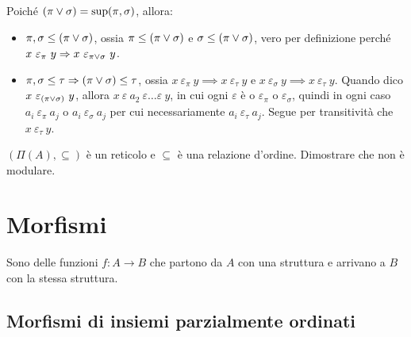 Poich\'e $(\pi \vee \sigma) = \sup (\pi, \sigma)$, allora:
\begin{itemize}
  \item $\pi, \sigma \le (\pi \vee \sigma)$, ossia $\pi \le (\pi \vee \sigma)$ e $\sigma \le (\pi \vee \sigma)$, vero per definizione perch\'e $x \ \varepsilon_{\pi} \ y \implies x \ \varepsilon_{\pi \supop \sigma} \ y$.
  \item $\pi, \sigma \le \tau \Rightarrow (\pi \vee \sigma) \le \tau$, ossia $x \ \varepsilon_{\pi} \ y \implies x \ \varepsilon_{\tau} \ y$ e $x \ \varepsilon_{\sigma} \ y \implies x \ \varepsilon_{\tau} \ y$. Quando dico $x \ \varepsilon_{(\pi \vee \sigma)} \ y$, allora $x \ \varepsilon \ a_2 \ \varepsilon \dots \varepsilon \ y$, in cui ogni $\varepsilon$ \`e o $\varepsilon_{\pi}$ o $\varepsilon_{\sigma}$, quindi in ogni caso $a_i \ \varepsilon_{\pi} \ a_j$ o $a_i \ \varepsilon_{\sigma} \ a_j$ per cui necessariamente $a_i \ \varepsilon_{\tau} \ a_j$. Segue per transitivit\`a che $x \ \varepsilon_{\tau} \ y$.
\end{itemize}

\begin{esercizio}
$(\Pi(A), \subseteq)$ \`e un reticolo e $\subseteq$ \`e una relazione d'ordine. Dimostrare che non \`e modulare.
\end{esercizio}

\section{Morfismi}

Sono delle funzioni $f : A \to B$ che partono da $A$ con una struttura e arrivano a $B$ con la stessa struttura.

\subsection{Morfismi di insiemi parzialmente ordinati}

